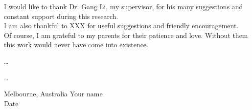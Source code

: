 
\def\baselinestretch{1.66}

I would like to thank Dr. Gang Li, my supervisor, 
for his many suggestions and constant support during this research. \\

I am also thankful to XXX for useful suggestions and friendly encouragement. \\

Of course, 
I am grateful to my parents for their patience and love. 
Without them this work would never have come into existence.

\ldots 


\ldots 


\bigskip\medskip

\noindent
Melbourne, Australia \hfill 
Your name \\
Date
